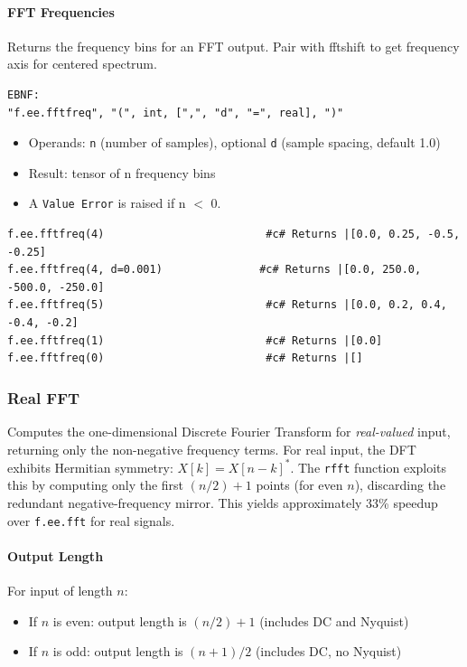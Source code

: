 \paragraph{FFT Frequencies}
Returns the frequency bins for an FFT output. Pair with fftshift to get frequency axis for centered spectrum.
\begin{verbatim}
EBNF:
"f.ee.fftfreq", "(", int, [",", "d", "=", real], ")"
\end{verbatim}
\begin{itemize}
\item Operands: \texttt{n} (number of samples), optional \texttt{d} (sample spacing, default 1.0)
\item Result: tensor of n frequency bins
\item A \texttt{Value Error} is raised if n $<$ 0.
\end{itemize}
\begin{verbatim}
f.ee.fftfreq(4)                         #c# Returns |[0.0, 0.25, -0.5, -0.25]
f.ee.fftfreq(4, d=0.001)               #c# Returns |[0.0, 250.0, -500.0, -250.0]
f.ee.fftfreq(5)                         #c# Returns |[0.0, 0.2, 0.4, -0.4, -0.2]
f.ee.fftfreq(1)                         #c# Returns |[0.0]
f.ee.fftfreq(0)                         #c# Returns |[]
\end{verbatim}

\subsubsection{Real FFT}
\label{sec:rfft}
Computes the one-dimensional Discrete Fourier Transform for \emph{real-valued} input, returning only the non-negative frequency terms. For real input, the DFT exhibits Hermitian symmetry: $X[k] = X[n-k]^*$. The \texttt{rfft} function exploits this by computing only the first $(n/2)+1$ points (for even $n$), discarding the redundant negative-frequency mirror. This yields approximately 33\% speedup over \texttt{f.ee.fft} for real signals.

\paragraph{Output Length}
For input of length $n$:
\begin{itemize}
\item If $n$ is even: output length is $(n/2) + 1$ (includes DC and Nyquist)
\item If $n$ is odd: output length is $(n+1) / 2$ (includes DC, no Nyquist)
\end{itemize}

